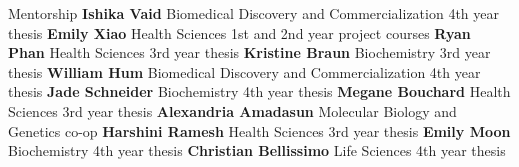 \begin{rubric}{Mentorship}
%
\entry*[2023 -- 2024]%
    \textbf{Ishika Vaid} Biomedical Discovery and Commercialization 4th year thesis
%
\entry*[2023]%
    \textbf{Emily Xiao} Health Sciences 1st and 2nd year project courses
%
\entry*[2023]%
    \textbf{Ryan Phan} Health Sciences 3rd year thesis
%
\entry*[2022]%
    \textbf{Kristine Braun} Biochemistry 3rd year thesis
%
\entry*[2021 -- 2022]%
    \textbf{William Hum} Biomedical Discovery and Commercialization 4th year thesis
%
\entry*[2019 -- 2020]%
    \textbf{Jade Schneider} Biochemistry 4th year thesis
%
\entry*[2019 -- 2020]%
    \textbf{Megane Bouchard} Health Sciences 3rd year thesis
%
\entry*[2019]%
    \textbf{Alexandria Amadasun} Molecular Biology and Genetics co-op
%
\entry*[2018 -- 2019]%
    \textbf{Harshini Ramesh} Health Sciences 3rd year thesis
%
\entry*[2017 -- 2018]%
    \textbf{Emily Moon} Biochemistry 4th year thesis
%
\entry*[2016 -- 2017]%
    \textbf{Christian Bellissimo} Life Sciences 4th year thesis
    
\end{rubric}
